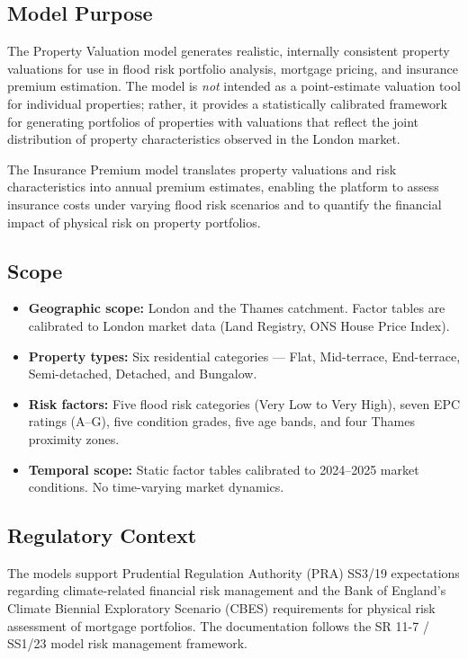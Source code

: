 \documentclass[11pt,a4paper]{article}
\begin{document}
\subsection{Model Purpose}

The Property Valuation model generates realistic, internally consistent
property valuations for use in flood risk portfolio analysis, mortgage
pricing, and insurance premium estimation. The model is \emph{not} intended
as a point-estimate valuation tool for individual properties; rather, it
provides a statistically calibrated framework for generating portfolios of
properties with valuations that reflect the joint distribution of property
characteristics observed in the London market.

The Insurance Premium model translates property valuations and risk
characteristics into annual premium estimates, enabling the platform to
assess insurance costs under varying flood risk scenarios and to quantify
the financial impact of physical risk on property portfolios.

\subsection{Scope}

\begin{itemize}
    \item \textbf{Geographic scope:} London and the Thames catchment.
          Factor tables are calibrated to London market data (Land Registry,
          ONS House Price Index).
    \item \textbf{Property types:} Six residential categories --- Flat,
          Mid-terrace, End-terrace, Semi-detached, Detached, and Bungalow.
    \item \textbf{Risk factors:} Five flood risk categories (Very Low to
          Very High), seven EPC ratings (A--G), five condition grades, five
          age bands, and four Thames proximity zones.
    \item \textbf{Temporal scope:} Static factor tables calibrated to
          2024--2025 market conditions. No time-varying market dynamics.
\end{itemize}

\subsection{Regulatory Context}

The models support Prudential Regulation Authority (PRA) SS3/19
expectations regarding climate-related financial risk management and the
Bank of England's Climate Biennial Exploratory Scenario (CBES) requirements
for physical risk assessment of mortgage portfolios. The documentation
follows the SR 11-7 / SS1/23 model risk management framework.
\end{document}
